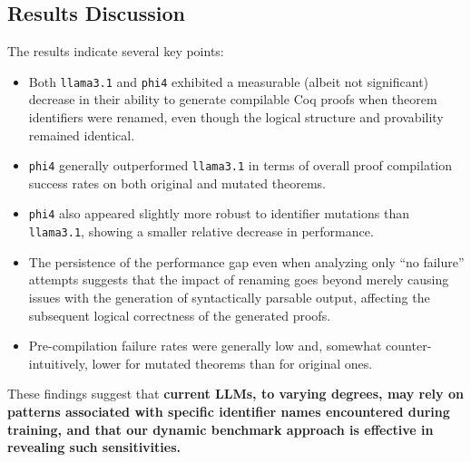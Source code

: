 \subsection{Results Discussion}
\label{sec:results_summary_observations}
The results indicate several key points:
\begin{itemize}
    \item Both \texttt{llama3.1} and \texttt{phi4} exhibited a measurable (albeit not significant) decrease in their ability to generate compilable Coq proofs when theorem identifiers were renamed, even though the logical structure and provability remained identical.
    \item \texttt{phi4} generally outperformed \texttt{llama3.1} in terms of overall proof compilation success rates on both original and mutated theorems.
    \item \texttt{phi4} also appeared slightly more robust to identifier mutations than \texttt{llama3.1}, showing a smaller relative decrease in performance.
    \item The persistence of the performance gap even when analyzing only ``no failure'' attempts suggests that the impact of renaming goes beyond merely causing issues with the generation of syntactically parsable output, affecting the subsequent logical correctness of the generated proofs.
    \item Pre-compilation failure rates were generally low and, somewhat counter-intuitively, lower for mutated theorems than for original ones.
\end{itemize}
These findings suggest that \textbf{current LLMs, to varying degrees, may rely on patterns associated with specific identifier names encountered during training, and that our dynamic benchmark approach is effective in revealing such sensitivities.}